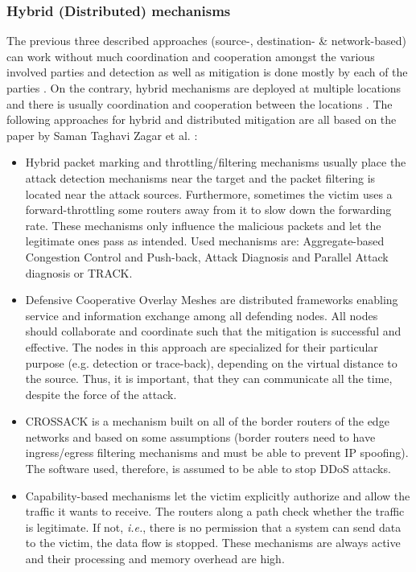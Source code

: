 \subsubsection*{Hybrid (Distributed) mechanisms} 
The previous three described approaches (source-, destination- \& network-based) can work without much coordination and cooperation amongst the various involved parties and detection as well as mitigation is done mostly by each of the parties \cite{DDoS-MitigationSurvey}. On the contrary, hybrid mechanisms are deployed at multiple locations and there is usually coordination and cooperation between the locations \cite{DDoS-MitigationSurvey}. The following approaches for hybrid and distributed mitigation are all based on the paper by Saman Taghavi Zagar et al. \cite{DDoS-MitigationSurvey}:
\begin{itemize}
    \item Hybrid packet marking and throttling/filtering mechanisms usually place the attack detection mechanisms near the target and the packet filtering is located near the attack sources. Furthermore, sometimes the victim uses a forward-throttling some routers away from it to slow down the forwarding rate. These mechanisms only influence the malicious packets and let the legitimate ones pass as intended. Used mechanisms are: Aggregate-based Congestion Control and Push-back, Attack Diagnosis and Parallel Attack diagnosis or TRACK.
    \item Defensive Cooperative Overlay Meshes are distributed frameworks enabling service and information exchange among all defending nodes. All nodes should collaborate and coordinate such that the mitigation is successful and effective. The nodes in this approach are specialized for their particular purpose (e.g. detection or trace-back), depending on the virtual distance to the source. Thus, it is important, that they can communicate all the time, despite the force of the attack. 
    \item CROSSACK is a mechanism built on all of the border routers of the edge networks and based on some assumptions (border routers need to have ingress/egress filtering mechanisms and must be able to prevent IP spoofing). The software used, therefore, is assumed to be able to stop DDoS attacks.
    \item Capability-based mechanisms let the victim explicitly authorize and allow the traffic it wants to receive. The routers along a path check whether the traffic is legitimate. If not, \emph{i.e.}, there is no permission that a system can send data to the victim, the data flow is stopped. These mechanisms are always active and their processing and memory overhead are high. 

\end{itemize}
